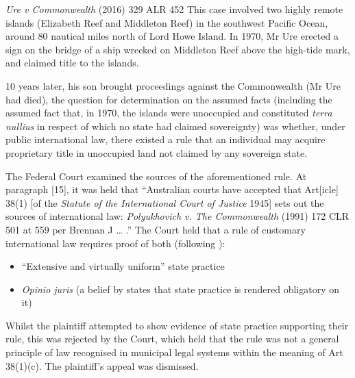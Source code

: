 \begin{casedetails}{\textit{Ure v Commonwealth} (2016) 329 ALR 452}\label{case:Ure v Commonwealth}
    \flushleft
    This case involved two highly remote islands (Elizabeth Reef and Middleton Reef) in the southwest Pacific Ocean, around 80 nautical miles north of Lord Howe Island. In 1970, Mr Ure erected a sign on the bridge of a ship wrecked on Middleton Reef above the high-tide mark, and claimed title to the islands.

    \vspace{\baselineskip}

    10 years later, his son brought proceedings against the Commonwealth (Mr Ure had died), the question for determination on the assumed facts (including the assumed fact that, in 1970, the islands were unoccupied and constituted \textit{terra nullius} in respect of which no state had claimed sovereignty) was whether, under public international law, there existed a rule that an individual may acquire proprietary title in unoccupied land not claimed by any sovereign state.

    \vspace{\baselineskip}

    The Federal Court examined the sources of the aforementioned rule. At paragraph [15], it was held that ``Australian courts have accepted that Art[icle] 38(1) [of the \textit{Statute of the International Court of Justice} 1945] sets out the sources of international law: \textit{Polyukhovich v. The Commonwealth }(1991) 172 CLR 501 at 559 per Brennan J … .” The Court held that a rule of customary international law requires proof of both (following ):
    \begin{itemize}
        \item ``Extensive and virtually uniform'' state practice
        \item \textit{Opinio juris} (a belief by states that state practice is rendered obligatory on it)
    \end{itemize}

    Whilst the plaintiff attempted to show evidence of state practice supporting their rule, this was rejected by the Court, which held that the rule was not a general principle of law recognised in municipal legal systems within the meaning of Art 38(1)(c). The plaintiff's appeal was dismissed.
\end{casedetails}

